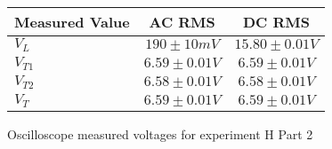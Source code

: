 \begin{figure}[H]    \centering    \begin{tabular}{|l|c|c|}
        \hline
        Measured Value & AC RMS & DC RMS \\
        \hline
        $V_{L}$ & $190\pm 10\unit{mV}$ & $15.80\pm 0.01\unit{V}$ \\
        $V_{T1}$ & $6.59\pm 0.01\unit{V}$ & $6.59\pm 0.01\unit{V}$ \\
        $V_{T2}$ & $6.58\pm 0.01\unit{V}$ & $6.58\pm 0.01\unit{V}$ \\
        $V_{T}$ & $6.59\pm 0.01\unit{V}$ & $6.59\pm 0.01\unit{V}$ \\
        \hline
    \end{tabular}    \caption{Oscilloscope measured voltages for experiment H Part 2}\end{figure}